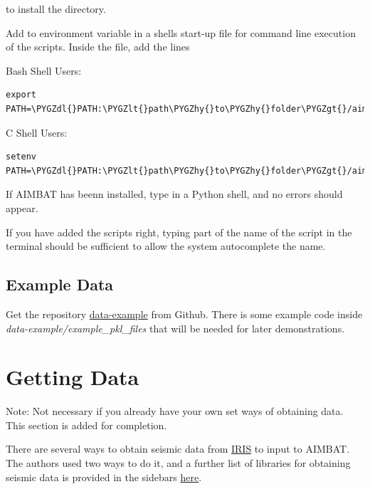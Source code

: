 \documentclass[letterpaper,10pt,english]{sphinxmanual}
\def\PYGZlt{\char`\<}
\def\PYGZgt{\char`\>}
\def\PYGZdl{\char`\$}
\def\PYGZhy{\char`\-}
\begin{document}
to install the  directory.

Add  to environment variable  in a shells start-up file for command line execution of the scripts. Inside the  file, add the lines

Bash Shell Users:

\begin{Verbatim}[commandchars=\\\{\}]
export PATH=\PYGZdl{}PATH:\PYGZlt{}path\PYGZhy{}to\PYGZhy{}folder\PYGZgt{}/aimbat/scripts
\end{Verbatim}

C Shell Users:

\begin{Verbatim}[commandchars=\\\{\}]
setenv PATH=\PYGZdl{}PATH:\PYGZlt{}path\PYGZhy{}to\PYGZhy{}folder\PYGZgt{}/aimbat/scripts
\end{Verbatim}

If AIMBAT has beenn installed, type  in a Python shell, and no errors should appear.

If you have added the scripts right, typing part of the name of the script in the terminal should be sufficient to allow the system autocomplete the name.


\section{Example Data}
\label{docfiles/install_aimbat:example-data}
Get the repository \href{https://github.com/pysmo/data-example}{data-example} from Github. There is some example code inside \emph{data-example/example\_pkl\_files} that will be needed for later demonstrations.


\chapter{Getting Data}
\label{docfiles/gettingData:getting-data}\label{docfiles/gettingData::doc}
Note: Not necessary if you already have your own set ways of obtaining data. This section is added for completion.

There are several ways to obtain seismic data from \href{http://www.iris.edu/dms/nodes/dmc/data/types/waveform-data/}{IRIS} to input to AIMBAT. The authors used two ways to do it, and a further list of libraries for obtaining seismic data is provided in the sidebars \href{http://www.iris.edu/dms/nodes/dmc/data/types/waveform-data/}{here}.
\end{document}
